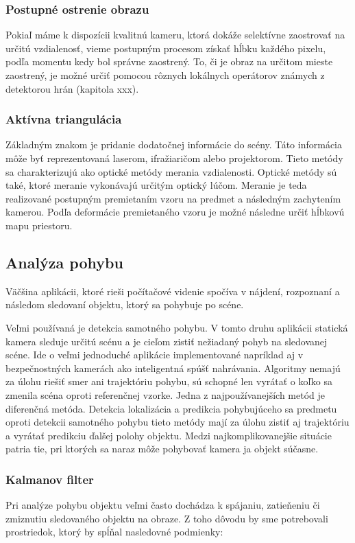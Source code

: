 \subsubsection{Postupné ostrenie obrazu }
Pokiaľ máme k dispozícii kvalitnú kameru, ktorá dokáže selektívne zaostrovať na určitú vzdialenosť, vieme postupným procesom získať hĺbku každého pixelu, podľa momentu kedy bol správne zaostrený. To, či je obraz na určitom mieste zaostrený, je možné určiť pomocou rôznych lokálnych operátorov známych z detektorou hrán (kapitola xxx). 


\subsubsection{Aktívna triangulácia }
Základným znakom je pridanie dodatočnej informácie do scény. Táto informácia môže byť reprezentovaná laserom, ifražiaričom alebo projektorom. Tieto metódy sa charakterizujú ako optické metódy merania vzdialenosti. Optické metódy sú také, ktoré meranie vykonávajú určitým optický lúčom.  Meranie je teda realizované postupným premietaním vzoru na predmet a následným zachytením kamerou. Podľa deformácie premietaného vzoru je možné následne určiť hĺbkovú mapu priestoru.

\subsection{Analýza pohybu }
Väčšina aplikácii, ktoré rieši počítačové videnie spočíva v nájdení, rozpoznaní a následom sledovaní objektu, ktorý sa pohybuje po scéne. 

Veľmi používaná je detekcia samotného pohybu. V tomto druhu aplikácii statická kamera sleduje určitú scénu a je cieľom zistiť nežiadaný pohyb na sledovanej scéne. Ide o veľmi jednoduché aplikácie implementované napríklad aj v bezpečnostných kamerách ako inteligentná spúšť nahrávania.  Algoritmy nemajú za úlohu riešiť smer ani trajektóriu pohybu, sú schopné len vyrátať o koľko sa zmenila scéna oproti referenčnej vzorke. Jedna z najpoužívanejších metód je diferenčná metóda. Detekcia lokalizácia a predikcia pohybujúceho sa predmetu oproti detekcii samotného pohybu tieto metódy mají  za úlohu zistiť aj trajektóriu a vyrátať predikciu ďalšej polohy objektu. Medzi najkomplikovanejšie situácie patria tie, pri ktorých sa naraz môže pohybovať kamera ja objekt súčasne.

\subsubsection{Kalmanov filter}
Pri analýze pohybu objektu veľmi často dochádza k spájaniu, zatieňeniu či zmiznutiu sledovaného  objektu na obraze. Z toho dôvodu by sme potrebovali prostriedok, ktorý by spĺňal nasledovné podmienky: 


